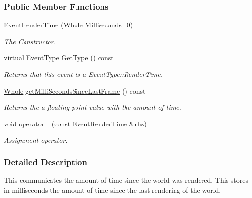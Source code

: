 \subsubsection*{Public Member Functions}
\begin{DoxyCompactItemize}
\item 
\hyperlink{classphys_1_1EventRenderTime_a104e523bc0d33c013aedab7fe10176b3}{EventRenderTime} (\hyperlink{namespacephys_a460f6bc24c8dd347b05e0366ae34f34a}{Whole} Milliseconds=0)
\begin{DoxyCompactList}\small\item\em The Constructor. \item\end{DoxyCompactList}\item 
virtual \hyperlink{classphys_1_1EventBase_a5e6a8564e127f654123f0bf6a2751923}{EventType} \hyperlink{classphys_1_1EventRenderTime_a160ca55bf9e5a2ae80dab82eab88baf5}{GetType} () const 
\begin{DoxyCompactList}\small\item\em Returns that this event is a EventType::RenderTime. \item\end{DoxyCompactList}\item 
\hyperlink{namespacephys_a460f6bc24c8dd347b05e0366ae34f34a}{Whole} \hyperlink{classphys_1_1EventRenderTime_a0227bea32aeeb214ef9abc17e55fa8eb}{getMilliSecondsSinceLastFrame} () const 
\begin{DoxyCompactList}\small\item\em Returns the a floating point value with the amount of time. \item\end{DoxyCompactList}\item 
void \hyperlink{classphys_1_1EventRenderTime_a329a34e064ab7f67c5c9eff517a560fc}{operator=} (const \hyperlink{classphys_1_1EventRenderTime}{EventRenderTime} \&rhs)
\begin{DoxyCompactList}\small\item\em Assignment operator. \item\end{DoxyCompactList}\end{DoxyCompactItemize}


\subsubsection{Detailed Description}
This communicates the amount of time since the world was rendered. This stores in milliseconds the amount of time since the last rendering of the world. 

